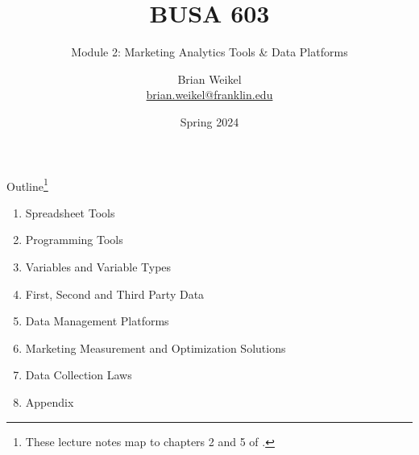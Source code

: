 \documentclass[pdf]{beamer}
\title{BUSA 603}
\subtitle{Module 2:   Marketing Analytics Tools \& Data Platforms}
\theoremstyle{remark}
\theoremstyle{definition}
\begin{document}
\author[B. Weikel, Franklin University]{
	\begin{tabular}{c} 
	\Large
	Brian Weikel\\
    \footnotesize \href{mailto:brian.weikel@franklin.edu}{brian.weikel@franklin.edu}
    \vspace{1ex}
\end{tabular}
\vspace{-4ex}}


\date{Spring 2024}%

\begin{noheadline}
\begin{frame}[t]\maketitle\end{frame}
\end{noheadline}

\begin{frame}[t]{Outline\footnote{These lecture notes map to chapters 2 and 5 of \cite{davis2022}.}}
\begin{enumerate}
\item Spreadsheet Tools 
\vspace{1.0ex}
\item Programming Tools
\vspace{1.0ex}
\item Variables and Variable Types
\vspace{1.0ex}
\item First, Second and Third Party Data
\vspace{1.0ex}
\item Data Management Platforms
\vspace{1.0ex}
\item Marketing Measurement and Optimization Solutions
\vspace{1.0ex}
\item Data Collection Laws
\vspace{1.0ex}
\item Appendix
\end{enumerate}
\end{frame}
\end{document}
